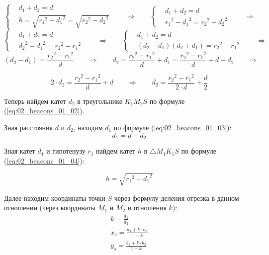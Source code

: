 \[
\left\{ 
	\begin{aligned}
		& d_1 + d_2 = d \\
		& h = \sqrt{{r_1}^2 - {d_1}^2} = \sqrt{{r_2}^2 - {d_2}^2}
	\end{aligned}
	\right.
	\qquad \Rightarrow \qquad
	\left\{ 
	\begin{aligned}
		& d_1 + d_2 = d \\
		& {r_1}^2 - {d_1}^2 = {r_2}^2 - {d_2}^2
	\end{aligned}
\right.
\qquad	\Rightarrow
\]
\[
	\left\{ 
		\begin{aligned}
			& d_1 + d_2 = d \\
			& {d_2}^2 - {d_1}^2 = {r_2}^2 - {r_1}^2
		\end{aligned}
		\right.
		\qquad \Rightarrow \qquad
		\left\{ 
		\begin{aligned}
			& d_1 + d_2 = d \\
			& (d_2 - d_1)(d_2 + d_1) = {r_2}^2 - {r_1}^2
		\end{aligned}
	\right.
	\qquad \Rightarrow
\]
\[
	(d_2 - d_1) = \frac{{r_2}^2 - {r_1}^2}{d} \qquad \Rightarrow \qquad
	d_2 = \frac{{r_2}^2 - {r_1}^2}{d} + d_1 = \frac{{r_2}^2 - {r_1}^2}{d} + d - d_2 \qquad \Rightarrow
\]

\begin{equation}
	2\cdot d_2 = \frac{{r_2}^2 - {r_1}^2}{d} + d \qquad \Rightarrow \qquad 
	d_2 = \frac {{r_2}^2 - {r_1}^2}{2\cdot d} + \frac{d}{2}
	\label{eq:02_beacons_01_02}
\end{equation}

Теперь найдем катет $d_2$ в треугольнике $K_1M_2S$ по формуле (\ref{eq:02_beacons_01_02}).

Зная расстояния $d$ и $d_2$, находим $d_1$ по формуле (\ref{eq:02_beacons_01_03}):
\begin{equation*}
	d_1 = d - d_2
	\label{eq:02_beacons_01_03}
\end{equation*}

Зная катет $d_1$ и гипотенузу $r_1$ найдем катет $h$ в $\triangle M_1K_1S$ по формуле (\ref{eq:02_beacons_01_04}):

\begin{equation}
	h = \sqrt{{r_1}^2 - {d_1}^2}
	\label{eq:02_beacons_01_04}
\end{equation}

Далее находим координаты точки $S$ через формулу деления отрезка в данном отношении (через координаты $M_1$ и $M_2$ и отношения $k$):
\begin{eqnarray}
		k = \frac{d_1}{d_2} \nonumber \\
		x_s = \frac{a_1 + k \cdot a_2}{1 + k} \label{eq:02_beacons_01_05} \\
		y_s = \frac{b_1 + k \cdot b_2}{1 + k} \label{eq:02_beacons_01_06}
\end{eqnarray}

